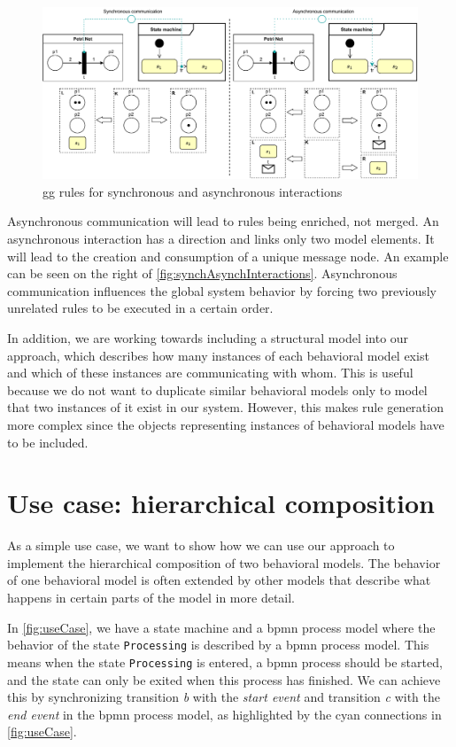 \documentclass[a4paper]{easychair}
\begin{document}
\begin{figure}[h]
    \centering
    \includegraphics[width=1\textwidth]{images/synch_asynch.pdf}
    \caption{\gls*{gg} rules for synchronous and asynchronous interactions}
    \label{fig:synchAsynchInteractions}
\end{figure}

Asynchronous communication will lead to rules being enriched, not merged.
An asynchronous interaction has a direction and links only two model elements.
It will lead to the creation and consumption of a unique message node. 
An example can be seen on the right of \autoref{fig:synchAsynchInteractions}.
Asynchronous communication influences the global system behavior by forcing two previously unrelated rules to be executed in a certain order.

In addition, we are working towards including a structural model into our approach, which describes how many instances of each behavioral model exist and which of these instances are communicating with whom.
This is useful because we do not want to duplicate similar behavioral models only to model that two instances of it exist in our system.
However, this makes rule generation more complex since the objects representing instances of behavioral models have to be included.

\section{Use case: hierarchical composition}
As a simple use case, we want to show how we can use our approach to implement the hierarchical composition of two behavioral models.
The behavior of one behavioral model is often extended by other models that describe what happens in certain parts of the model in more detail.

In \autoref{fig:useCase}, we have a state machine and a \gls*{bpmn} process model where the behavior of the state \texttt{Processing} is described by a \gls*{bpmn} process model.
This means when the state \texttt{Processing} is entered, a \gls*{bpmn} process should be started, and the state can only be exited when this process has finished.
We can achieve this by synchronizing transition \textit{b} with the \textit{start event} and transition \textit{c} with the \textit{end event} in the \gls*{bpmn} process model, as highlighted by the cyan connections in \autoref{fig:useCase}.
\end{document}
